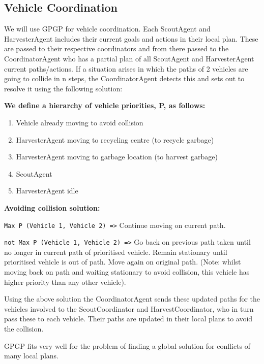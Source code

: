 \subsection{Vehicle Coordination}

We will use GPGP for vehicle coordination. Each ScoutAgent and HarvesterAgent includes their current goals and actions in their local plan. These are passed to their respective coordinators and from there passed to the CoordinatorAgent who has a partial plan of all ScoutAgent and HarvesterAgent current paths/actions. If a situation arises in which the paths of 2 vehicles are going to collide in n steps, the CoordinatorAgent detects this and sets out to resolve it using the following solution:

\textbf{We define a hierarchy of vehicle priorities, P, as follows:}

\begin{enumerate}
	\item Vehicle already moving to avoid collision
	\item HarvesterAgent moving to recycling centre (to recycle garbage)
	\item HarvesterAgent moving to garbage location (to harvest garbage)
	\item ScoutAgent 
	\item HarvesterAgent idle 
\end{enumerate}

\textbf{Avoiding collision solution:}


\texttt{Max P (Vehicle 1, Vehicle 2) =>} Continue moving on current path.

\texttt{not Max P (Vehicle 1, Vehicle 2) =>} Go back on previous path taken until no longer in current path of prioritised vehicle. Remain stationary until prioritised vehicle is out of path. Move again on original path. (Note: whilst moving back on path and waiting stationary to avoid collision, this vehicle has higher priority than any other vehicle).

Using the above solution the CoordinatorAgent sends these updated paths for the vehicles involved to the ScoutCoordinator and HarvestCoordinator, who in turn pass these to each vehicle. Their paths are updated in their local plans to avoid the collision.

GPGP fits very well for the problem of finding a global solution for conflicts of many local plans.









